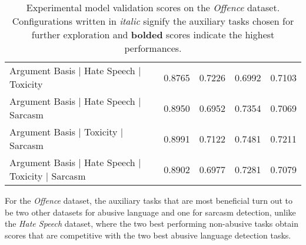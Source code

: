 \begin{table}[h]
\begin{tabular}{l|cccc}
    Argument Basis | Hate Speech | Toxicity               & 0.8765          & 0.7226          & 0.6992          & 0.7103          \\
    Argument Basis | Hate Speech | Sarcasm                & 0.8950          & 0.6952          & 0.7354          & 0.7069          \\
    Argument Basis | Toxicity | Sarcasm                   & 0.8991          & 0.7122          & 0.7481          & 0.7211          \\
    Argument Basis | Hate Speech | Toxicity | Sarcasm     & 0.8902          & 0.6977          & 0.7281          & 0.7079
  \end{tabular}
  \caption{Experimental model validation scores on the \textit{Offence} dataset. Configurations written in \textit{italic} signify the auxiliary tasks chosen for further exploration and \textbf{bolded} scores indicate the highest performances.}
  \label{tab:mtl_dev_davidson}
\end{table}

For the \textit{Offence} dataset, the auxiliary tasks that are most beneficial turn out to be two other datasets for abusive language and one for sarcasm detection, unlike the \textit{Hate Speech} dataset, where the two best performing non-abusive tasks obtain scores that are competitive with the two best abusive language detection tasks.


